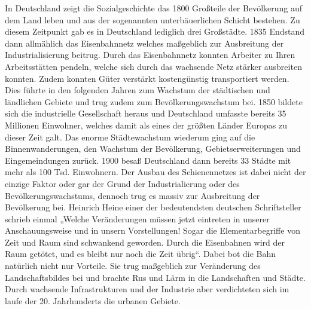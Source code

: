 \documentclass{scrartcl}
\begin{document}
In Deutschland zeigt die Sozialgeschichte das 1800 Großteile der Bevölkerung auf dem Land leben und aus der sogenannten unterbäuerlichen Schicht bestehen. Zu diesem Zeitpunkt gab es in Deutschland lediglich drei Großstädte. 1835 Endstand dann allmählich das Eisenbahnnetz welches maßgeblich zur Ausbreitung der Industrialisierung beitrug. Durch das Eisenbahnnetz konnten Arbeiter zu Ihren Arbeitsstätten pendeln, welche sich durch das wachsende Netz stärker ausbreiten konnten. Zudem konnten Güter verstärkt kostengünstig transportiert werden. Dies führte in den folgenden Jahren zum Wachstum der städtischen und ländlichen Gebiete und trug zudem zum Bevölkerungswachstum bei. 1850 bildete sich die industrielle Gesellschaft heraus und Deutschland umfasste bereits 35 Millionen Einwohner, welches damit als eines der größten Länder Europas zu dieser Zeit galt. Das enorme Städtewachstum wiederum ging auf die Binnenwanderungen, den Wachstum der Bevölkerung, Gebietserweiterungen und Eingemeindungen zurück. 1900 besaß Deutschland dann bereits 33 Städte mit mehr als 100 Tsd. Einwohnern. Der Ausbau des Schienennetzes ist dabei nicht der einzige Faktor oder gar der Grund der Industrialierung oder des Bevölkerungswachstums, dennoch trug es massiv zur Ausbreitung der Bevölkerung bei. Heinrich Heine einer der bedeutendsten deutschen Schriftsteller schrieb einmal „Welche Veränderungen müssen jetzt eintreten in unserer Anschauungsweise und in unsern Vorstellungen! Sogar die Elementarbegriffe von Zeit und Raum sind schwankend geworden. Durch die Eisenbahnen wird der Raum getötet, und es bleibt nur noch die Zeit übrig“. Dabei bot die Bahn natürlich nicht nur Vorteile. Sie trug maßgeblich zur Veränderung des Landschaftsbildes bei und brachte Rus und Lärm in die Landschaften und Städte. Durch wachsende Infrastrukturen und der Industrie aber verdichteten sich im laufe der 20. Jahrhunderts die urbanen Gebiete.
\end{document}
